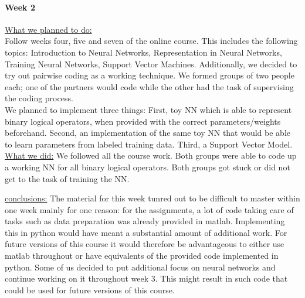 \documentclass[•]{article}
\begin{document}
\paragraph{Week 2} \underline{What we planned to do:}\\
Follow weeks four, five and seven of the online course. This includes the following topics: Introduction to Neural Networks, Representation in Neural Networks, Training Neural Networks, Support Vector Machines. Additionally, we decided to try out pairwise coding as a working technique. We formed groups of two people each; one of the partners would code while the other had the task of supervising the coding process.\\
We planned to implement three things: First, toy NN which is able to represent binary logical operators, when provided with the correct parameters/weights beforehand. Second, an implementation of the same toy NN that would be able to learn parameters from labeled training data. Third, a Support Vector Model.\\
\underline{What we did:} We followed all the course work. Both groups were able to code up a working NN for all binary logical operators. Both groups got stuck or did not get to the task of training the NN.

\underline{conclusions:} The material for this week tunred out to be difficult to master within one week mainly for one reason: for the assignments, a lot of code taking care of tasks such as data preparation was already provided in matlab. Implementing this in python would have meant a substantial amount of additional work. For future versions of this course it would therefore be advantageous to either use matlab throughout or have equivalents of the provided code implemented in python. Some of us decided to put additional focus on neural networks and continue working on it throughout week 3. This might result in such code that could be used for future versions of this course.
\end{document}
